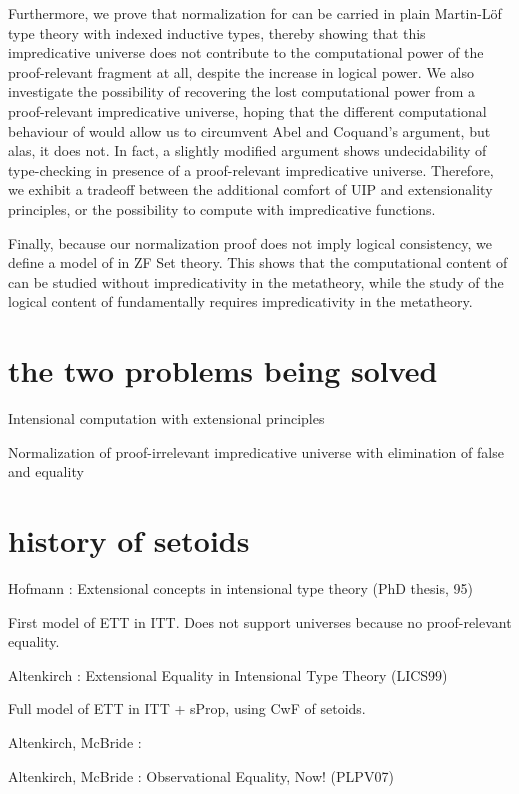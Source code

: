 %
Furthermore, we prove that normalization for \SetoidCC can be
carried in plain Martin-Löf type theory with indexed inductive types,
thereby showing that this impredicative universe does not contribute
to the computational power of the proof-relevant fragment at all,
despite the increase in logical power.
%
We also investigate the possibility of recovering the lost computational power
from a proof-relevant impredicative universe, hoping that the different
computational behaviour of \SetoidCC would allow us to circumvent Abel and
Coquand's argument, but alas, it does not. In fact, a slightly modified
argument shows undecidability of type-checking in presence of a
proof-relevant impredicative universe.
%
Therefore, we exhibit a tradeoff between the additional comfort of
UIP and extensionality principles, or the possibility to compute with
impredicative functions.

Finally, because our normalization proof does not imply logical
consistency, we define a model of \SetoidCC in ZF Set
theory.
%
This shows that the computational content of \SetoidCC can be studied
without impredicativity in the metatheory, while the study of the
logical content of \SetoidCC fundamentally requires impredicativity in
the metatheory. 

\section{the two problems being solved}

Intensional computation with extensional principles

Normalization of proof-irrelevant impredicative universe with elimination of false and equality

\section{history of setoids}

Hofmann : Extensional concepts in intensional type theory (PhD thesis, 95)

First model of ETT in ITT. Does not support universes because no proof-relevant equality.

Altenkirch : Extensional Equality in Intensional Type Theory (LICS99)

Full model of ETT in ITT + sProp, using CwF of setoids.

Altenkirch, McBride : 

Altenkirch, McBride : Observational Equality, Now! (PLPV07)

